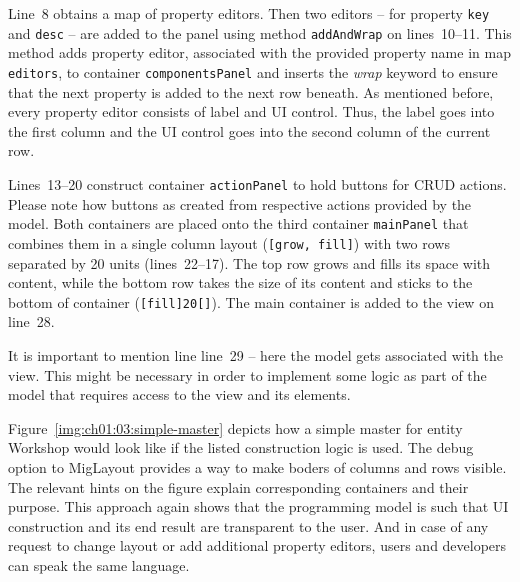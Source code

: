   Line~8 obtains a map of property editors.
  Then two editors -- for property \texttt{key} and \texttt{desc} -- are added to the panel using method \texttt{addAndWrap} on lines~10--11.
  This method adds property editor, associated with the provided property name in map \texttt{editors}, to container \texttt{componentsPanel} and inserts the \emph{wrap} keyword to ensure that the next property is added to the next row beneath.
  As mentioned before, every property editor consists of label and UI control.
  Thus, the label goes into the first column and the UI control goes into the second column of the current row.
  
  Lines~13--20 construct container \texttt{actionPanel} to hold buttons for CRUD actions.
  Please note how buttons as created from respective actions provided by the model.
  Both containers are placed onto the third container \texttt{mainPanel} that combines them in a single column layout (\texttt{[grow, fill]}) with two rows separated by 20 units (lines~22--17).
  The top row grows and fills its space with content, while the bottom row takes the size of its content and sticks to the bottom of container (\texttt{[fill]20[]}).
  The main container is added to the view on line~28.
  
  It is important to mention line line~29 -- here the model gets associated with the view.
  This might be necessary in order to implement some logic as part of the model that requires access to the view and its elements.
  
  
  Figure~\ref{img:ch01:03:simple-master} depicts how a simple master for entity Workshop would look like if the listed construction logic is used.  
  The debug option to MigLayout provides a way to make boders of columns and rows visible.
  The relevant hints on the figure explain corresponding containers and their purpose.
  This approach again shows that the programming model is such that UI construction and its end result are transparent to the user.
  And in case of any request to change layout or add additional property editors, users and developers can speak the same language.
  

